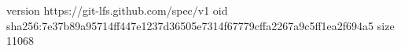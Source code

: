 version https://git-lfs.github.com/spec/v1
oid sha256:7e37b89a95714ff447e1237d36505e7314f67779cffa2267a9c5ff1ea2f694a5
size 11068
